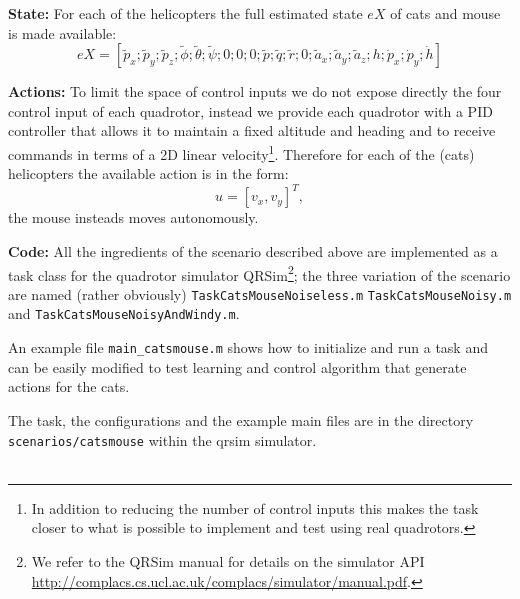 \documentclass[a4paper,11pt]{article}
\newcommand{\webman}{\url{http://complacs.cs.ucl.ac.uk/complacs/simulator/manual.pdf}\xspace}
\begin{document}
\textbf{State:} 
For each of the helicopters the full estimated state $eX$ of cats and mouse is made available:
$$eX = [\tilde{p}_x;\tilde{p}_y;\tilde{p}_z;\tilde{\phi};\tilde{\theta};\tilde{\psi};0;0;0;\tilde{p};\tilde{q};\tilde{r};0;\tilde{a}_x;\tilde{a}_y;\tilde{a}_z;h;\dot{p}_x;\dot{p}_y;\dot{h}]$$

\textbf{Actions:} 
To limit the space of control inputs we do not expose directly the four control input of each quadrotor, instead we provide each quadrotor with a PID controller that allows it to maintain a fixed altitude and heading and to receive commands in terms of a 2D linear velocity\footnote{In addition to reducing the number of control inputs this makes the task closer to what is possible to implement and test using real quadrotors.}. 
Therefore for each of the (cats) helicopters the available action is in the form:
$$u=[v_x,v_y]^T,$$
the mouse insteads moves autonomously. 

\textbf{Code:}
All the ingredients of the scenario described above are implemented as a task class for the quadrotor simulator QRSim\footnote{We refer to the QRSim manual for details on the simulator API \webman.}; the three variation of the scenario are named (rather obviously) \texttt{TaskCatsMouseNoiseless.m} \texttt{TaskCatsMouseNoisy.m} and \texttt{TaskCatsMouseNoisyAndWindy.m}. 

An example file \texttt{main\_catsmouse.m} shows how to initialize and run a task and can be easily modified to test learning and control algorithm that generate actions for the cats.

The task, the configurations and the example main files are in the directory \texttt{scenarios/catsmouse} within the qrsim simulator. 
\\
\\
\end{document}
